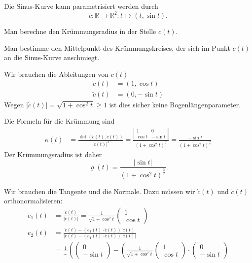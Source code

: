 Die Sinus-Kurve kann parametrisiert werden durch
\[
c\colon \mathbb R\to \mathbb R^2 : t\mapsto (t,\sin t).
\]
\begin{teilaufgaben}
\item
Man berechne den Krümmungsradius in der Stelle $c(t)$.
\item
Man bestimme den Mittelpunkt des Krümmungskreises, der sich im Punkt $c(t)$
an die Sinus-Kurve anschmiegt.
\end{teilaufgaben}


\begin{loesung}
Wir brauchen die Ableitungen von $c(t)$
\begin{align*}
\dot c(t)
&=
(1,\cos t)
\\
\ddot c(t)
&=
(0,-\sin t)
\end{align*}
Wegen $|\dot c(t)|=\sqrt{1+\cos^2t}\ge 1$ ist dies sicher keine Bogenlängenparameter.
\begin{teilaufgaben}
\item
Die Formeln für die Krümmung sind
\begin{align*}
\kappa(t)
&=
\frac{\det(\dot c(t),\ddot c(t))}{|\dot c(t)|^3}
=
\frac{\left|\begin{matrix}1&0\\\cos t&-\sin t\end{matrix}\right|}{(1+\cos^2t)^\frac32}
=
\frac{-\sin t}{(1+\cos^2t)^\frac32}
\end{align*}
Der Krümmungsradius ist daher
\[
\varrho(t)
=
\frac{|\sin t|}{(1+\cos^2t)^\frac32}.
\]
\item
Wir brauchen die Tangente und die Normale.
Dazu müssen wir $\dot c(t)$ und $\ddot c(t)$ orthonormalisieren:
\begin{align*}
e_1(t)
&=
\frac{\dot c(t)}{|\dot c(t)|}
=
\frac1{\sqrt{1+\cos^2t}}
\begin{pmatrix}1\\ \cos t\end{pmatrix}
\\
e_2(t)
&=
\frac{\ddot c(t) - (e_1(t)\cdot \ddot c(t))\;\ddot c(t)}{|\ddot c(t) - (e_1(t)\cdot \ddot c(t))\;\ddot c(t)|}
\\
&=
\frac{1}{\dots}\left(
\begin{pmatrix}0\\-\sin t\end{pmatrix}
-
\left(
\frac{1}{\sqrt{1+\cos^2t}}
\begin{pmatrix}1\\\cos t\end{pmatrix}
\cdot
\begin{pmatrix}0\\-\sin t\end{pmatrix}

\end{align*}
\end{teilaufgaben}
\end{loesung}
